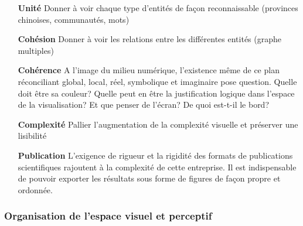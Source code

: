 \begin{itemize}
    \item[\textbf{Unité}] 
    Donner à voir chaque type d{\textquoteright}entités de fa\c{c}on reconnaissable (provinces chinoises, communautés, mots)

    \item[\textbf{Cohésion}] 
    Donner à voir les relations entre les différentes entités (graphe multiples)

    \item[\textbf{Cohérence}]
    A l{\textquoteright}image du milieu numérique, l{\textquoteright}existence même de ce plan réconciliant global, local, réel, symbolique et imaginaire pose question. Quelle doit être sa couleur? Quelle peut en être la justification logique dans l{\textquoteright}espace de la visualisation? Et que penser de l{\textquoteright}écran? De quoi est-t-il le bord?

    \item[\textbf{Complexité}] 
    Pallier l{\textquoteright}augmentation de la complexité visuelle et préserver une lisibilité

    \item[\textbf{Publication}]
    L{\textquoteright}exigence de rigueur et la rigidité des formats de publications scientifiques rajoutent à la complexité de cette entreprise. Il est indispensable  de pouvoir exporter les résultats sous forme de figures de façon propre et ordonnée.
\end{itemize} 

\subsubsection{Organisation de l'espace visuel et perceptif}
\label{sec:viz}

